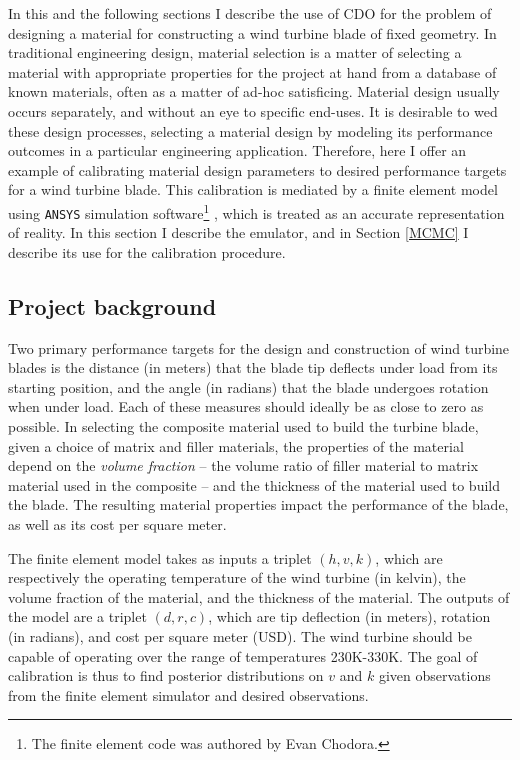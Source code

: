 \documentclass{article}
\begin{document}
In this and the following sections I describe the use of CDO for the problem of designing a material for constructing a wind turbine blade of fixed geometry. In traditional engineering design, material selection is a matter of selecting a material with appropriate properties for the project at hand from a database of known materials, often as a matter of ad-hoc satisficing. Material design usually occurs separately, and without an eye to specific end-uses. It is desirable to wed these design processes, selecting a material design by modeling its performance outcomes in a particular engineering application. Therefore, here I offer an example of calibrating material design parameters to desired performance targets for a wind turbine blade. This calibration is mediated by a finite element model using \texttt{ANSYS} simulation software\footnote{
The finite element code was authored by Evan Chodora.
}
, which is treated as an accurate representation of reality. In this section I describe the emulator, and in Section \ref{MCMC} I describe its use for the calibration procedure.

\subsection{Project background}

Two primary performance targets for the design and construction of wind turbine blades is the distance (in meters) that the blade tip deflects under load from its starting position, and the angle (in radians) that the blade undergoes rotation when under load. Each of these measures should ideally be as close to zero as possible. In selecting the composite material used to build the turbine blade, given a choice of matrix and filler materials, the properties of the material depend on the \textit{volume fraction} -- the volume ratio of filler material to matrix material used in the composite -- and the thickness of the material used to build the blade. The resulting material properties impact the performance of the blade, as well as its cost per square meter. 

The finite element model takes as inputs a triplet $(h,v,k)$, which are respectively the operating temperature of the wind turbine (in kelvin), the volume fraction of the material, and the thickness of the material. The outputs of the model are a triplet $(d,r,c)$, which are tip deflection (in meters), rotation (in radians), and cost per square meter (USD). The wind turbine should be capable of operating over the range of temperatures 230K-330K. The goal of calibration is thus to find posterior distributions on $v$ and $k$ given observations from the finite element simulator and desired observations.
\end{document}
